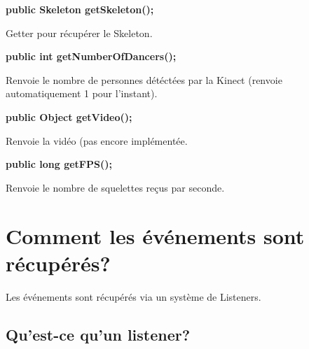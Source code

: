 \documentclass{report}
\begin{document}
\textbf{public Skeleton getSkeleton();}

Getter pour r\'ecup\'erer le Skeleton.


\hspace{1\baselineskip}

\textbf{public int getNumberOfDancers();}

Renvoie le nombre de personnes d\'et\'ect\'ees par la Kinect (renvoie automatiquement 1 pour l'instant).


\hspace{1\baselineskip}

\textbf{public Object getVideo();}

Renvoie la vid\'eo (pas encore impl\'ement\'ee.


\hspace{1\baselineskip}

\textbf{public long getFPS();}

Renvoie le nombre de squelettes re\c{c}us par seconde.



\chapter*{Comment les \'ev\'enements sont r\'ecup\'er\'es?}
Les \'ev\'enements sont r\'ecup\'er\'es via un syst\`eme de Listeners.

\section*{Qu'est-ce qu'un listener?}
\end{document}
